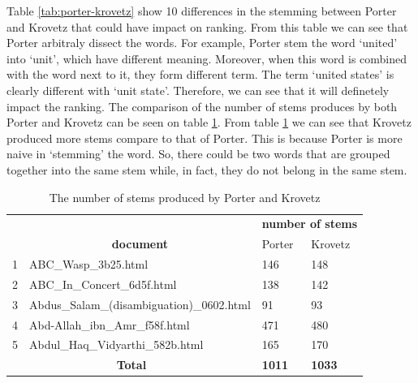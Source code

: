 \documentclass[letterpaper,11pt]{article}
\begin{document}
Table \ref{tab:porter-krovetz} show 10 differences in the stemming between Porter and Krovetz that could have impact on ranking. From this table we can see that Porter arbitraly dissect the words. For example, Porter stem the word `united' into `unit', which have different meaning. Moreover, when this word is combined with the word next to it, they form different term. The term `united states' is clearly different with `unit state'. Therefore, we can see that it will definetely impact the ranking. 
The comparison of the number of stems produces by both Porter and Krovetz can be seen on table \ref{tab:stem}. From table \ref{tab:stem} we can see that Krovetz produced more stems compare to that of Porter. This is because Porter is more naive in `stemming' the word. So, there could be two words that are grouped together into the same stem while, in fact, they do not belong in the same stem. 

\begin{table}[H]
\centering
\begin{tabular}{|l|l|l|l|}
\hline
\rowcolor[HTML]{ECF4FF} 
\multicolumn{1}{|c|}{\cellcolor[HTML]{ECF4FF}} & \multicolumn{1}{c|}{\cellcolor[HTML]{ECF4FF}} & \multicolumn{2}{c|}{\cellcolor[HTML]{ECF4FF}\textbf{number of stems}} \\ \cline{3-4} 
\rowcolor[HTML]{ECF4FF} 
\multicolumn{1}{|c|}{\multirow{-2}{*}{\cellcolor[HTML]{ECF4FF}\textbf{No}}} & \multicolumn{1}{c|}{\multirow{-2}{*}{\cellcolor[HTML]{ECF4FF}\textbf{document}}} & Porter & Krovetz \\ \hline
1 & ABC\_Wasp\_3b25.html & 146 & 148 \\ \hline
2 & ABC\_In\_Concert\_6d5f.html & 138 & 142 \\ \hline
3 & Abdus\_Salam\_(disambiguation)\_0602.html & 91 & 93 \\ \hline
4 & Abd-Allah\_ibn\_Amr\_f58f.html & 471 & 480 \\ \hline
5 & Abdul\_Haq\_Vidyarthi\_582b.html & 165 & 170 \\ \hline
\multicolumn{2}{|c|}{\textbf{Total}} & \textbf{1011} & \textbf{1033} \\ \hline
\end{tabular}
\caption{The number of stems produced by Porter and Krovetz}
\label{tab:stem}
\end{table}
\end{document}

